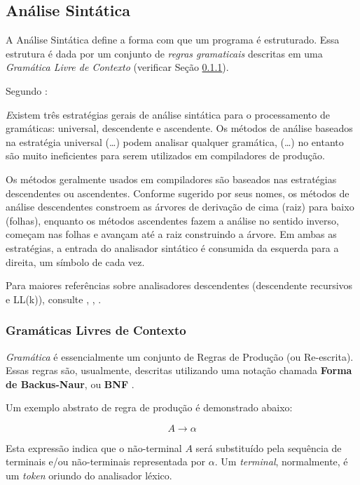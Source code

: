 \subsection{Análise Sintática}

A Análise Sintática define a forma com que um programa é estruturado. Essa
estrutura é dada por um conjunto de \emph{regras gramaticais} descritas em uma
\emph{Gramática Livre de Contexto} (verificar Seção \ref{sec:context_free_grammar}).

Segundo :
\begin{citacao}{4cm}{0cm}\footnotesize \emph
	Existem três estratégias gerais de análise sintática para o processamento
	de gramáticas: universal, descendente e ascendente. Os métodos de análise
	baseados na estratégia universal (\dots) podem analisar qualquer
	gramática, (\dots) no entanto são muito ineficientes para serem utilizados
	em compiladores de produção.

	Os métodos geralmente usados em compiladores são baseados nas estratégias
	descendentes ou ascendentes. Conforme sugerido por seus nomes, os métodos
	de análise descendentes constroem as árvores de derivação de cima (raiz)
	para baixo (folhas), enquanto os métodos ascendentes fazem a análise no
	sentido inverso, começam nas folhas e avançam até a raiz construindo a
	árvore. Em ambas as estratégias, a entrada do analisador sintático é
	consumida da esquerda para a direita, um símbolo de cada vez.
\end{citacao}

Para maiores referências sobre analisadores descendentes (descendente
recursivos e LL(k)), consulte , ,
.

\subsubsection{Gramáticas Livres de Contexto}
\label{sec:context_free_grammar}

\emph{Gramática} é essencialmente um conjunto de Regras de Produção (ou
Re-escrita). Essas regras são, usualmente, descritas utilizando uma notação
chamada \textbf{Forma de Backus-Naur}, ou \textbf{BNF} \cite{louden97-pt}.

Um exemplo abstrato de regra de produção é demonstrado abaixo:

\[
A \rightarrow \alpha
\]

Esta expressão indica que o não-terminal \(A\) será substituído pela sequência
de terminais e/ou não-terminais representada por \(\alpha\). Um \emph{terminal},
normalmente, é um \emph{token} oriundo do analisador léxico.

